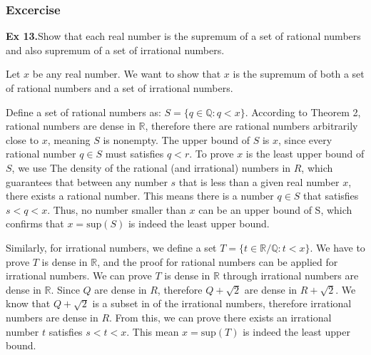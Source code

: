 \subsubsection{Excercise}

\textbf{Ex 13.}Show that each real number is the supremum of a set of rational numbers and also supremum of a set of irrational numbers.

Let $x$ be any real number. We want to show that $x$ is the supremum of both a set of rational numbers and a set of irrational numbers.

Define a set of rational numbers as: $S=\{q \in \mathbb{Q}: q < x\}$. According to Theorem 2, rational numbers are dense in $\mathbb{R}$, therefore there are rational numbers arbitrarily close to $x$, meaning $S$ is nonempty. The upper bound of $S$ is $x$, since every rational number $q \in S$ must satisfies $q < r$. To prove $x$ is the least upper bound of $S$, we use The density of the rational (and irrational) numbers in $R$, which guarantees that between any number $s$ that is less than a given real number $x$, there exists a rational number. This means there is a number $q \in S$ that satisfies $s < q < x$. Thus, no number smaller than $x$ can be an upper bound of S, which confirms that $x = \text{sup}(S)$ is indeed the least upper bound.

Similarly, for irrational numbers, we define a set $T = \{t \in \mathbb{R} / \mathbb{Q} : t < x\}$. We have to prove $T$ is dense in $\mathbb{R}$, and the proof for rational numbers can be applied for irrational numbers. We can prove $T$ is dense in $\mathbb{R}$ through irrational numbers are dense in $\mathbb{R}$. Since $Q$ are dense in $R$, therefore $Q + \sqrt{2}$ are dense in $R + \sqrt{2}$. We know that $Q + \sqrt{2}$ is a subset in of the irrational numbers, therefore irrational numbers are dense in $R$. From this, we can prove there exists an irrational number $t$ satisfies $s < t < x$. This mean $x = \text{sup}(T)$ is indeed the least upper bound.